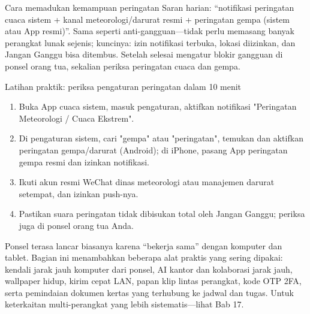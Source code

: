 \begin{tcbinfo}{Cara memadukan kemampuan peringatan}
Saran harian: “notifikasi peringatan cuaca sistem + kanal meteorologi/darurat resmi + peringatan gempa (sistem atau App resmi)”. Sama seperti anti-gangguan—tidak perlu memasang banyak perangkat lunak sejenis; kuncinya: izin notifikasi terbuka, lokasi diizinkan, dan Jangan Ganggu bisa ditembus. Setelah selesai mengatur blokir gangguan di ponsel orang tua, sekalian periksa peringatan cuaca dan gempa.

\end{tcbinfo}

\begin{tcbpractice}{Latihan praktik: periksa pengaturan peringatan dalam 10 menit}
\begin{enumerate}
  \item Buka App cuaca sistem, masuk pengaturan, aktifkan notifikasi "Peringatan Meteorologi / Cuaca Ekstrem".
  \item Di pengaturan sistem, cari "gempa" atau "peringatan", temukan dan aktifkan peringatan gempa/darurat (Android); di iPhone, pasang App peringatan gempa resmi dan izinkan notifikasi.
  \item Ikuti akun resmi WeChat dinas meteorologi atau manajemen darurat setempat, dan izinkan push-nya.
  \item Pastikan suara peringatan tidak dibisukan total oleh Jangan Ganggu; periksa juga di ponsel orang tua Anda.
\end{enumerate}

\end{tcbpractice}


Ponsel terasa lancar biasanya karena “bekerja sama” dengan komputer dan tablet. Bagian ini menambahkan beberapa alat praktis yang sering dipakai: kendali jarak jauh komputer dari ponsel, AI kantor dan kolaborasi jarak jauh, wallpaper hidup, kirim cepat LAN, papan klip lintas perangkat, kode OTP 2FA, serta pemindaian dokumen kertas yang terhubung ke jadwal dan tugas. Untuk keterkaitan multi-perangkat yang lebih sistematis—lihat Bab 17.


